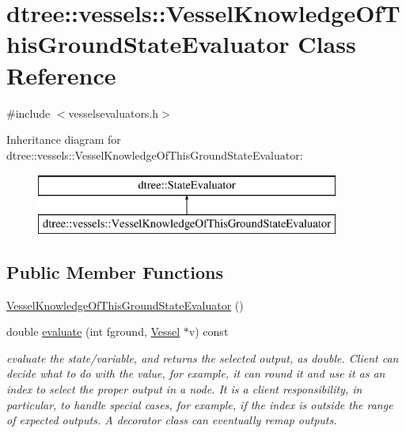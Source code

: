 \hypertarget{classdtree_1_1vessels_1_1_vessel_knowledge_of_this_ground_state_evaluator}{}\section{dtree\+::vessels\+::Vessel\+Knowledge\+Of\+This\+Ground\+State\+Evaluator Class Reference}
\label{classdtree_1_1vessels_1_1_vessel_knowledge_of_this_ground_state_evaluator}


{\ttfamily \#include $<$vesselsevaluators.\+h$>$}

Inheritance diagram for dtree\+::vessels\+::Vessel\+Knowledge\+Of\+This\+Ground\+State\+Evaluator\+:\begin{figure}[H]
\begin{center}
\leavevmode
\includegraphics[height=2.000000cm]{d2/d7b/classdtree_1_1vessels_1_1_vessel_knowledge_of_this_ground_state_evaluator}
\end{center}
\end{figure}
\subsection*{Public Member Functions}
\begin{DoxyCompactItemize}
\item 
\mbox{\hyperlink{classdtree_1_1vessels_1_1_vessel_knowledge_of_this_ground_state_evaluator_a3be969c7dd1b586d9738da5375dadc9d}{Vessel\+Knowledge\+Of\+This\+Ground\+State\+Evaluator}} ()
\item 
double \mbox{\hyperlink{classdtree_1_1vessels_1_1_vessel_knowledge_of_this_ground_state_evaluator_aca0d591380daef97acd9034914f54499}{evaluate}} (int fground, \mbox{\hyperlink{class_vessel}{Vessel}} $\ast$v) const
\begin{DoxyCompactList}\small\item\em evaluate the state/variable, and returns the selected output, as double. Client can decide what to do with the value, for example, it can round it and use it as an index to select the proper output in a node. It is a client responsibility, in particular, to handle special cases, for example, if the index is outside the range of expected outputs. A decorator class can eventually remap outputs. \end{DoxyCompactList}\end{DoxyCompactItemize}


